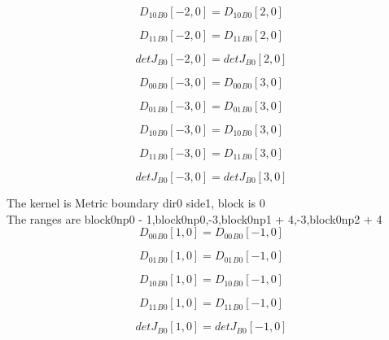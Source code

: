 \documentclass{article}
\begin{document}
\begin{dmath}{D_{10}{_{B0}}}[{-2,0}] = {D_{10}{_{B0}}}[{2,0}]\end{dmath}

\begin{dmath}{D_{11}{_{B0}}}[{-2,0}] = {D_{11}{_{B0}}}[{2,0}]\end{dmath}

\begin{dmath}{detJ{_{B0}}}[{-2,0}] = {detJ{_{B0}}}[{2,0}]\end{dmath}

\begin{dmath}{D_{00}{_{B0}}}[{-3,0}] = {D_{00}{_{B0}}}[{3,0}]\end{dmath}

\begin{dmath}{D_{01}{_{B0}}}[{-3,0}] = {D_{01}{_{B0}}}[{3,0}]\end{dmath}

\begin{dmath}{D_{10}{_{B0}}}[{-3,0}] = {D_{10}{_{B0}}}[{3,0}]\end{dmath}

\begin{dmath}{D_{11}{_{B0}}}[{-3,0}] = {D_{11}{_{B0}}}[{3,0}]\end{dmath}

\begin{dmath}{detJ{_{B0}}}[{-3,0}] = {detJ{_{B0}}}[{3,0}]\end{dmath}

\noindent The kernel is Metric boundary dir0 side1, block is 0\\\noindent The ranges are block0np0 - 1,block0np0,-3,block0np1 + 4,-3,block0np2 + 4\\\begin{dmath}{D_{00}{_{B0}}}[{1,0}] = {D_{00}{_{B0}}}[{-1,0}]\end{dmath}

\begin{dmath}{D_{01}{_{B0}}}[{1,0}] = {D_{01}{_{B0}}}[{-1,0}]\end{dmath}

\begin{dmath}{D_{10}{_{B0}}}[{1,0}] = {D_{10}{_{B0}}}[{-1,0}]\end{dmath}

\begin{dmath}{D_{11}{_{B0}}}[{1,0}] = {D_{11}{_{B0}}}[{-1,0}]\end{dmath}

\begin{dmath}{detJ{_{B0}}}[{1,0}] = {detJ{_{B0}}}[{-1,0}]\end{dmath}
\end{document}

